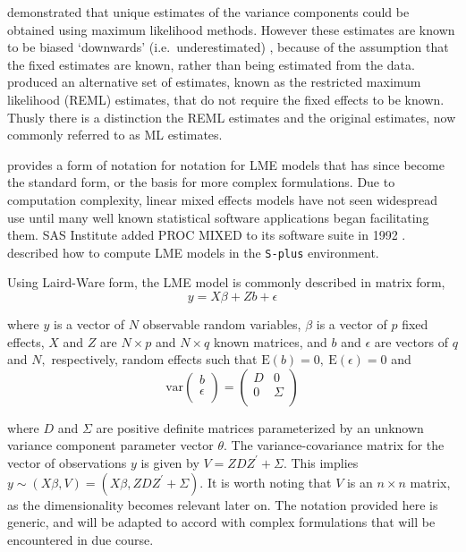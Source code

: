 \documentclass[12pt, a4paper]{report}
\theoremstyle{plain}
\theoremstyle{definition}
\theoremstyle{remark}
\begin{document}
\citet{HartleyRao} demonstrated that unique estimates of the variance components could be obtained using maximum likelihood methods. However these estimates are known to be biased `downwards' (i.e.\ underestimated) , because of the assumption that the fixed estimates are known, rather than being estimated from the data. \citet{PattersonThompson} produced an alternative set of estimates, known as the restricted maximum likelihood (REML) estimates, that do not require the fixed effects to be known. Thusly there is a distinction the REML estimates and the original estimates, now commonly referred to as ML estimates.

\citet{LW82} provides a form of notation for notation for LME models that has since become the standard form, or the basis for more complex formulations. Due to computation complexity, linear mixed effects models have not seen widespread use until many well known statistical software applications began facilitating them. SAS Institute added PROC MIXED to its software suite in 1992 \citep{singer}. \citet{PB} described how to compute LME models in the \texttt{S-plus} environment.

Using Laird-Ware form, the LME model is commonly described in matrix form,
\begin{equation}
y = X\beta + Zb + \epsilon
\label{LW}
\end{equation}

\noindent where $y$ is a vector of $N$ observable random variables, $\beta$ is a vector of $p$ fixed effects, $X$ and $Z$ are $N \times p$ and $N \times q$ known matrices, and $b$ and $\epsilon$  are vectors of $q$ and $N,$ respectively, random effects such that $\mathrm{E}(b)=0, \ \mathrm{E}(\epsilon)=0$
and
\[
\mathrm{var}
\left(
\begin{array}{c}
b \\
\epsilon \\
\end{array}
\right)
=
\left(
\begin{array}{cc}
D & 0 \\
0 & \Sigma \\
\end{array}
\right)
\]




where $D$ and $\Sigma$ are positive definite matrices parameterized by an unknown variance component parameter vector $ \theta.$ The variance-covariance matrix for the vector of observations $y$ is given by $V = ZDZ^{\prime}+ \Sigma.$ This implies $y \sim(X\beta, V) = (X\beta,ZDZ^{\prime}+ \Sigma)$. It is worth noting that $V$ is an $n \times n$ matrix, as the dimensionality becomes relevant later on. The notation provided here is generic, and will be adapted to accord with complex formulations that will be encountered in due course.
\end{document}
